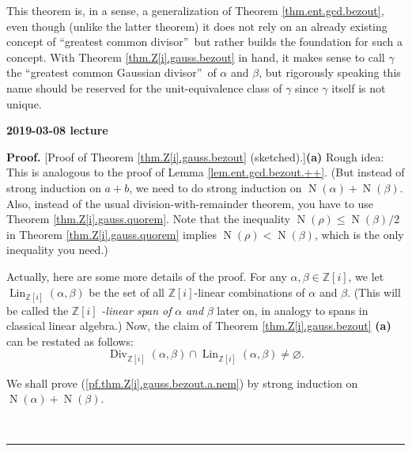 \documentclass[numbers=enddot,12pt,final,onecolumn,notitlepage]{scrartcl}%
\numberwithin{exer}{subsection}
\theoremstyle{definition}
\newenvironment{proof}[1][Proof]{\noindent\textbf{#1.} }{\ \rule{0.5em}{0.5em}}
\begin{document}
This theorem is, in a sense, a generalization of Theorem
\ref{thm.ent.gcd.bezout}, even though (unlike the latter theorem) it does not
rely on an already existing concept of \textquotedblleft greatest common
divisor\textquotedblright\ but rather builds the foundation for such a
concept. With Theorem \ref{thm.Z[i].gauss.bezout} in hand, it makes sense to
call $\gamma$ the \textquotedblleft greatest common Gaussian
divisor\textquotedblright\ of $\alpha$ and $\beta$, but rigorously speaking
this name should be reserved for the unit-equivalence class of $\gamma$ since
$\gamma$ itself is not unique.

\begin{center}
\textbf{2019-03-08 lecture}
\end{center}

\begin{proof}
[Proof of Theorem \ref{thm.Z[i].gauss.bezout} (sketched).]\textbf{(a)} Rough
idea: This is analogous to the proof of Lemma \ref{lem.ent.gcd.bezout.++}.
(But instead of strong induction on $a+b$, we need to do strong induction on
$\operatorname*{N}\left(  \alpha\right)  +\operatorname*{N}\left(
\beta\right)  $. Also, instead of the usual division-with-remainder theorem,
you have to use Theorem \ref{thm.Z[i].gauss.quorem}. Note that the inequality
$\operatorname*{N}\left(  \rho\right)  \leq\operatorname*{N}\left(
\beta\right)  /2$ in Theorem \ref{thm.Z[i].gauss.quorem} implies
$\operatorname*{N}\left(  \rho\right)  <\operatorname*{N}\left(  \beta\right)
$, which is the only inequality you need.)

Actually, here are some more details of the proof. For any $\alpha,\beta
\in\mathbb{Z}\left[  i\right]  $, we let $\operatorname*{Lin}%
\nolimits_{\mathbb{Z}\left[  i\right]  }\left(  \alpha,\beta\right)  $ be the
set of all $\mathbb{Z}\left[  i\right]  $-linear combinations of $\alpha$ and
$\beta$. (This will be called the $\mathbb{Z}\left[  i\right]  $%
\textit{-linear span of }$\alpha$ \textit{and }$\beta$ later on, in analogy to
spans in classical linear algebra.) Now, the claim of Theorem
\ref{thm.Z[i].gauss.bezout} \textbf{(a)} can be restated as follows:%
\begin{equation}
\operatorname*{Div}\nolimits_{\mathbb{Z}\left[  i\right]  }\left(
\alpha,\beta\right)  \cap\operatorname*{Lin}\nolimits_{\mathbb{Z}\left[
i\right]  }\left(  \alpha,\beta\right)  \neq\varnothing.
\label{pf.thm.Z[i].gauss.bezout.a.nem}%
\end{equation}


We shall prove (\ref{pf.thm.Z[i].gauss.bezout.a.nem}) by strong induction on
$\operatorname*{N}\left(  \alpha\right)  +\operatorname*{N}\left(
\beta\right)  $.


\end{proof}
\end{document}
